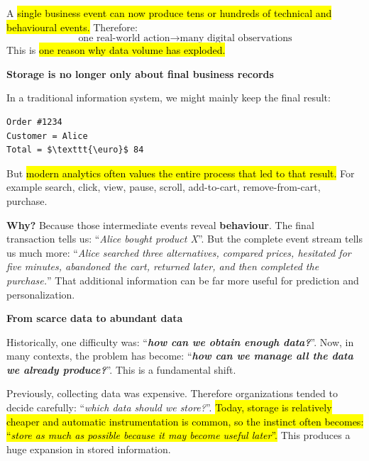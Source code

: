 \highspace
A \hl{single business event can now produce tens or hundreds of technical and behavioural events.} Therefore:
\begin{equation*}
    \text{one real-world action}
    \rightarrow
    \text{many digital observations}
\end{equation*}
This is \hl{one reason why data volume has exploded.}

\newpage

\begin{flushleft}
    \textcolor{Green3}{ \textbf{Storage is no longer only about final business records}}
\end{flushleft}
In a traditional information system, we might mainly keep the final result:
\begin{lstlisting}[mathescape=true]
Order #1234
Customer = Alice
Total = $\texttt{\euro}$ 84
\end{lstlisting}
But \hl{modern analytics often values the entire process that led to that result.} For example search, click, view, pause, scroll, add-to-cart, remove-from-cart, purchase.

\highspace
\textcolor{Green3}{ \textbf{Why?}} Because those intermediate events reveal \textbf{behaviour}. The final transaction tells us: ``\emph{Alice bought product X}''. But the complete event stream tells us much more: ``\emph{Alice searched three alternatives, compared prices, hesitated for five minutes, abandoned the cart, returned later, and then completed the purchase.}'' That additional information can be far more useful for prediction and personalization.

\highspace
\begin{flushleft}
    \textcolor{Green3}{ \textbf{From scarce data to abundant data}}
\end{flushleft}
Historically, one difficulty was: ``\emph{\textbf{how can we obtain enough data?}}''. Now, in many contexts, the problem has become: ``\emph{\textbf{how can we manage all the data we already produce?}}''. This is a fundamental shift.

\highspace
Previously, collecting data was expensive. Therefore organizations tended to decide carefully: ``\emph{which data should we store?}''. \hl{Today, storage is relatively cheaper and automatic instrumentation is common, so the instinct often becomes: ``\emph{store as much as possible because it may become useful later}''.} This produces a huge expansion in stored information.


